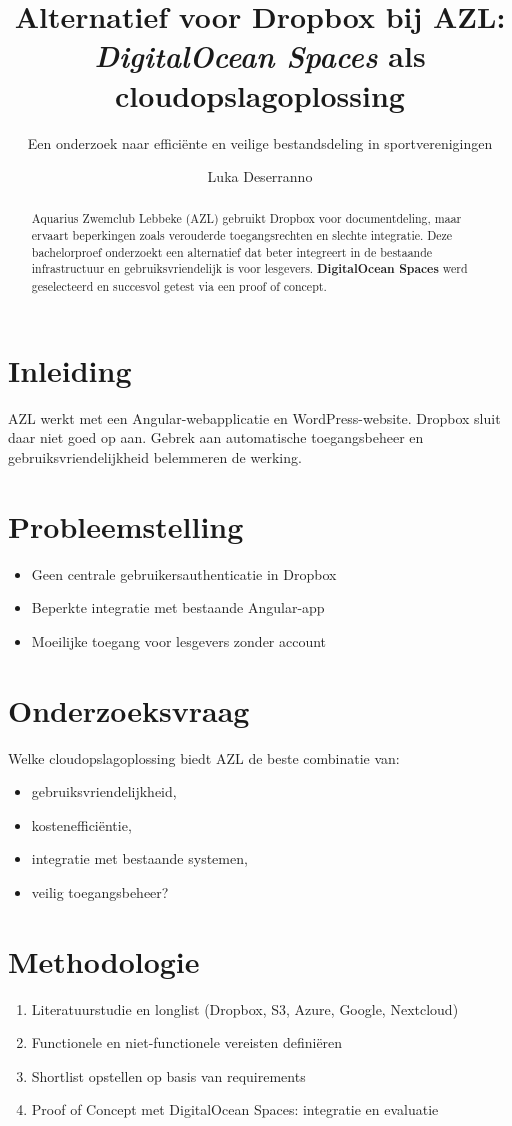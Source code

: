 \documentclass[a0,portrait]{hogent-poster}
\title{Alternatief voor Dropbox bij AZL: \textit{DigitalOcean Spaces} als cloudopslagoplossing}
\subtitle{Een onderzoek naar efficiënte en veilige bestandsdeling in sportverenigingen}
\author{Luka Deserranno}
\begin{document}
\maketitle

\begin{abstract}
Aquarius Zwemclub Lebbeke (AZL) gebruikt Dropbox voor documentdeling, maar ervaart beperkingen zoals verouderde toegangsrechten en slechte integratie. Deze bachelorproef onderzoekt een alternatief dat beter integreert in de bestaande infrastructuur en gebruiksvriendelijk is voor lesgevers. \textbf{DigitalOcean Spaces} werd geselecteerd en succesvol getest via een proof of concept.
\end{abstract}

\begin{multicols}{2}

\section*{Inleiding}
AZL werkt met een Angular-webapplicatie en WordPress-website. Dropbox sluit daar niet goed op aan. Gebrek aan automatische toegangsbeheer en gebruiksvriendelijkheid belemmeren de werking.

\section*{Probleemstelling}
\begin{itemize}
  \item Geen centrale gebruikersauthenticatie in Dropbox
  \item Beperkte integratie met bestaande Angular-app
  \item Moeilijke toegang voor lesgevers zonder account
\end{itemize}

\section*{Onderzoeksvraag}
Welke cloudopslagoplossing biedt AZL de beste combinatie van:
\begin{itemize}
  \item gebruiksvriendelijkheid,
  \item kostenefficiëntie,
  \item integratie met bestaande systemen,
  \item veilig toegangsbeheer?
\end{itemize}

\section*{Methodologie}
\begin{enumerate}
  \item Literatuurstudie en longlist (Dropbox, S3, Azure, Google, Nextcloud)
  \item Functionele en niet-functionele vereisten definiëren
  \item Shortlist opstellen op basis van requirements
  \item Proof of Concept met DigitalOcean Spaces: integratie en evaluatie
\end{enumerate}


\end{multicols}
\end{document}
